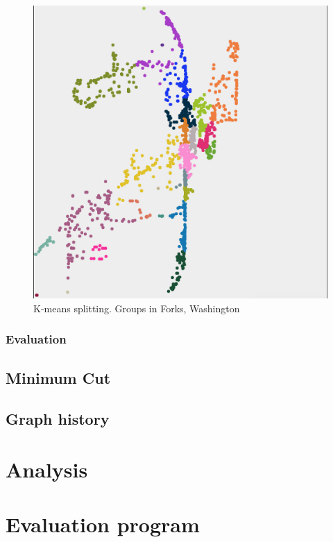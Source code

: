 \begin{figure}[h]
	\center
	\includegraphics[scale=0.35]{Images/computations/KMEANSForks.jpg}
	\caption{K-means splitting. Groups in Forks, Washington}
	\label{fig:kmeans_forks}
\end{figure}





\subsubsection{Evaluation}

\subsection{Minimum Cut}

\subsection{Graph history}



\section{Analysis}
\section{Evaluation program}

